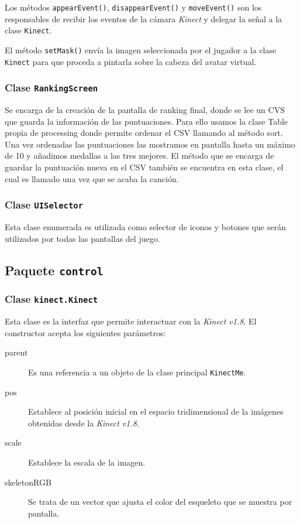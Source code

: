 \documentclass[10pt,a4paper]{report}
\begin{document}
	Los métodos \texttt{appearEvent()}, \texttt{disappearEvent()} y \texttt{moveEvent()} son los responsables de recibir los eventos de la cámara \textit{Kinect} y delegar la señal a la clase \texttt{Kinect}.
	
	El método \texttt{setMask()} envía la imagen seleccionada por el jugador a la clase \texttt{Kinect} para que proceda a pintarla sobre la cabeza del avatar virtual.

	
	 
	 
	 \subsubsection{Clase \texttt{RankingScreen}}
	 Se encarga de la creación de la pantalla de ranking final, donde se lee un CVS que guarda la información de las puntuaciones. Para ello usamos la clase Table propia de processing donde permite ordenar el CSV llamando al método sort. Una vez ordenadas las puntuaciones las mostramos en pantalla hasta un máximo de 10 y añadimos medallas a las tres mejores. 
	El método que se encarga de guardar la puntuación nueva en el CSV también se encuentra en esta clase, el cual es llamado una vez que se acaba la canción.
	
	
	 
	 \subsubsection{Clase \texttt{UISelector}}
	Esta clase enumerada es utilizada como selector de iconos y botones que serán utilizados por todas las pantallas del juego.
	
	
	
	\subsection{Paquete \texttt{control}}
	\subsubsection{Clase \texttt{kinect.Kinect}}\label{class:kinect.Kinect}
	Esta clase es la interfaz que permite interactuar con la \textit{Kinect v1.8}. El constructor acepta los siguientes parámetros:
	\begin{description}
	\item[parent] Es una referencia a un objeto de la clase principal \texttt{KinectMe}.
	\item[pos] Establece al posición inicial en el espacio tridimensional de la imágenes obtenidas desde la \textit{Kinect v1.8}.
	\item[scale] Establece la escala de la imagen.
	\item[skeletonRGB] Se trata de un vector que ajusta el color del esqueleto que se muestra por pantalla.
	\end{description}
	
\end{document}
